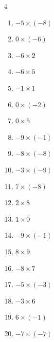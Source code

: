 \begin{multicols}{4}
\begin{enumerate}
  \item $-5\times (-8)$
        \phantom{$=40$}

  \item $0\times (-6)$
        \phantom{$=0$}

  \item $-6\times 2$
        \phantom{$=-12$}

  \item $-6\times 5$
        \phantom{$=-30$}

  \item $-1\times 1$
        \phantom{$=-1$}

  \item $0\times (-2)$
        \phantom{$=0$}

  \item $0\times 5$
        \phantom{$=0$}

  \item $-9\times (-1)$
        \phantom{$=9$}

  \item $-8\times (-8)$
        \phantom{$=64$}

  \item $-3\times (-9)$
        \phantom{$=27$}

  \item $7\times (-8)$
        \phantom{$=-56$}

  \item $2\times 8$
        \phantom{$=16$}

  \item $1\times 0$
        \phantom{$=0$}

  \item $-9\times (-1)$
        \phantom{$=9$}

  \item $8\times 9$
        \phantom{$=72$}

  \item $-8\times 7$
        \phantom{$=-56$}

\columnbreak %

\resetques

  \item $-5\times (-3)$
        \phantom{$=15$}

  \item $-3\times 6$
        \phantom{$=-18$}

  \item $6\times (-1)$
        \phantom{$=-6$}

  \item $-7\times (-7)$
        \phantom{$=49$}


\end{enumerate}
\end{multicols}
